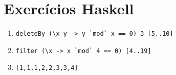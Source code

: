 \documentclass[a4paper,twocolumn,10pt]{article}
\begin{document}
\section{Exercícios Haskell}

\begin{enumerate}

	\item
		\begin{Verbatim}[tabsize=0, fontsize=\small]
		deleteBy (\x y -> y `mod` x == 0) 3 [5..10]
		\end{Verbatim}

	\item
		\begin{Verbatim}[tabsize=0, fontsize=\small]
		filter (\x -> x `mod` 4 == 0) [4..19]
		\end{Verbatim}

	\item
		\begin{Verbatim}[tabsize=0, fontsize=\small]
		[1,1,1,2,2,3,3,4]
		\end{Verbatim}

\end{enumerate}

\footnotesize 

\end{document}
